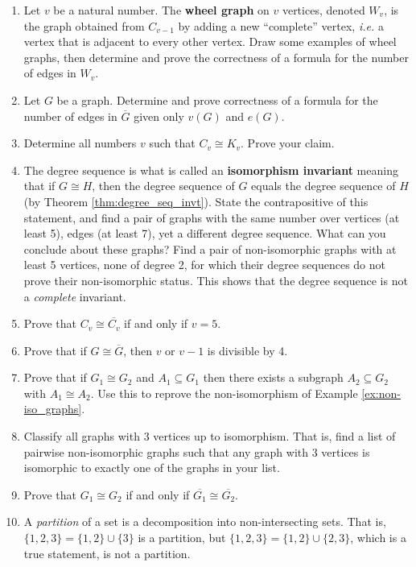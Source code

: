 \begin{exercises}
\begin{enumerate}
    \item Let $v$ be a natural number.  The \textbf{wheel graph} on $v$ vertices, denoted $W_v$, is the graph obtained from $C_{v-1}$ by adding a new ``complete'' vertex, \textit{i.e.} a vertex that is adjacent to every other vertex.  Draw some examples of wheel graphs, then determine and prove the correctness of a formula for the number of edges in $W_v$.
    \item Let $G$ be a graph.  Determine and prove correctness of a formula for the number of edges in $\overline{G}$ given only $v(G)$ and $e(G)$.
    \item Determine all numbers $v$ such that $C_v \cong K_v$. Prove your claim.
    \item The degree sequence is what is called an \textbf{isomorphism invariant} meaning that if $G \cong H$, then the degree sequence of $G$ equals the degree sequence of $H$ (by Theorem \ref{thm:degree_seq_invt}).  State the contrapositive of this statement, and find a pair of graphs with the same number over vertices (at least 5), edges (at least 7), yet a different degree sequence.  What can you conclude about these graphs?  Find a pair of non-isomorphic graphs with at least 5 vertices, none of degree 2, for which their degree sequences do not prove their non-isomorphic status.  This shows that the degree sequence is not a \textit{complete} invariant.
    \item Prove that $C_v \cong \overline{C_v}$ if and only if $v = 5$.
    \item Prove that if $G \cong \overline{G}$, then $v$ or $v-1$ is divisible by 4.
    \item Prove that if $G_1 \cong G_2$ and $A_1 \subseteq G_1$ then there exists a subgraph $A_2 \subseteq G_2$ with $A_1 \cong A_2$.  Use this to reprove the non-isomorphism of Example \ref{ex:non-iso_graphs}.
    \item Classify all graphs with 3 vertices up to isomorphism.  That is, find a list of pairwise non-isomorphic graphs such that any graph with 3 vertices is isomorphic to exactly one of the graphs in your list.
    \item Prove that $G_1 \cong G_2$ if and only if $\overline{G_1} \cong \overline{G_2}$.
    \item A \textit{partition} of a set is a decomposition into non-intersecting sets.  That is, $\{1,2,3\} = \{1,2\} \cup \{3\}$ is a partition, but $\{1,2,3\} = \{1,2\} \cup \{2, 3\}$, which is a true statement, is not a partition.


\end{enumerate}
\end{exercises}
